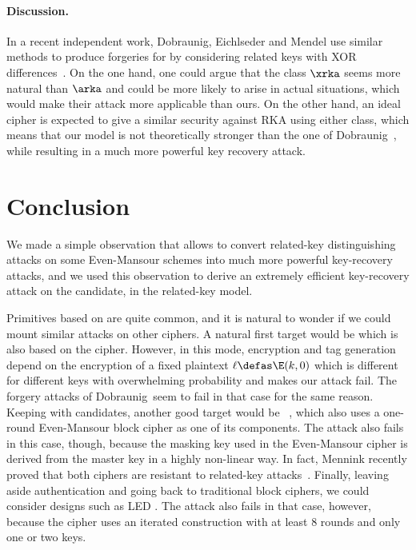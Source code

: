 \paragraph{Discussion.}

In a recent independent work, Dobraunig, Eichlseder and Mendel use similar methods to produce forgeries for \proestotr by considering
related keys with XOR differences~\cite{DEM15}. On the one hand, one could argue that the class $\xrka$ seems more natural than $\arka$
and could be more likely to arise in actual situations, which would
make their attack more applicable than ours. On the other hand, an ideal cipher is expected to give a similar security against
RKA using either class, which means that our model is not theoretically stronger than the one of Dobraunig~\etal, while resulting in a
much more powerful key recovery attack.

\section{Conclusion}

We made a simple observation that allows to convert related-key distinguishing attacks on some Even-Mansour schemes into much more
powerful key-recovery attacks, and we used this observation to derive an extremely efficient key-recovery attack on the
\proestotr \caesar candidate, in the related-key model.

Primitives based on \EM are quite common, and it is natural to wonder if we could mount similar
attacks on other ciphers. A natural first target would be \proestcopa which is also based on the \proestem cipher.
However, in this mode,
encryption and tag generation depend on the encryption of a fixed plaintext $\ell \defas \E(k, 0)$ which is different
for different keys with overwhelming probability and makes our attack fail. The forgery attacks of
Dobraunig~\etal seem to fail in that case for the same reason.
Keeping with \caesar candidates, another good target would be \minalpher~\cite{minalpher}, which also
uses a one-round Even-Mansour block cipher as one of its components. The attack also fails in this
case, though, because the masking key used in the Even-Mansour cipher is derived from the master key
in a highly non-linear way. In fact, Mennink recently proved that both ciphers are resistant
to related-key attacks~\cite{DBLP:conf/crypto/Mennink16}.
Finally, leaving aside authentication and
going back to traditional block ciphers, we could consider designs such as LED \cite{LED}. The attack
also fails in that case, however, because the cipher uses an iterated construction with at least 8 rounds and
only one or two keys.

